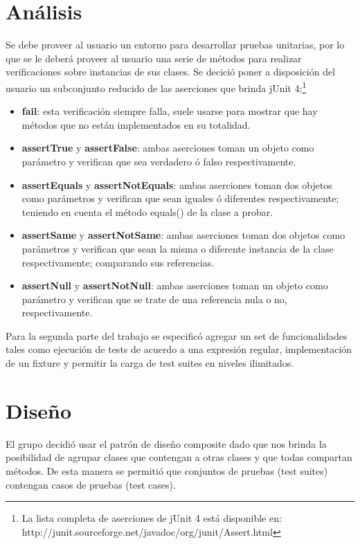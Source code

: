 \documentclass[12pt]{article}
\begin{document}
\section{Análisis}
Se debe proveer al usuario un entorno para desarrollar pruebas unitarias, por lo
que se le deberá proveer al usuario una serie de métodos para realizar 
verificaciones sobre instancias de sus clases. Se decició poner a disposición 
del usuario un subconjunto reducido de las aserciones que brinda jUnit 4:\footnote{
La lista completa de aserciones de jUnit 4 está disponible en: \\
http://junit.sourceforge.net/javadoc/org/junit/Assert.html}
	\begin{itemize}
		\item \textbf{fail}: esta verificación siempre falla, suele usarse para
			mostrar que hay métodos que no están implementados
			en su totalidad.
		\item \textbf{assertTrue} y \textbf{assertFalse}: ambas aserciones toman un 
			objeto como parámetro y verifican que sea verdadero ó 
			falso respectivamente.
		\item \textbf{assertEquals} y \textbf{assertNotEquals}: ambas aserciones toman dos
			objetos como parámetros y verifican que sean iguales ó 
			diferentes respectivamente; teniendo en cuenta el método
			equals() de la clase a probar.
		\item \textbf{assertSame} y \textbf{assertNotSame}: ambas aserciones toman dos 
			objetos como parámetros y verifican que sean la misma 
			o diferente instancia de la clase respectivamente; 
			comparando sus referencias.
		\item \textbf{assertNull} y \textbf{assertNotNull}: ambas aserciones toman un 
			objeto como parámetro y verifican que se trate de una
			referencia nula o no, respectivamente.
	\end{itemize}
	
Para la segunda parte del trabajo se especificó agregar un set de funcionalidades tales como
ejecución de tests de acuerdo a una expresión regular, implementación de un fixture y permitir
la carga de test suites en niveles ilimitados.
	
\section{Diseño}
El grupo decidió usar el patrón de diseño composite dado que nos brinda la 
posibilidad de agrupar clases que contengan a otras clases y que todas compartan
métodos. De esta manera se permitió que conjuntos de pruebas (test suites) 
contengan casos de pruebas (test cases).
\end{document}
